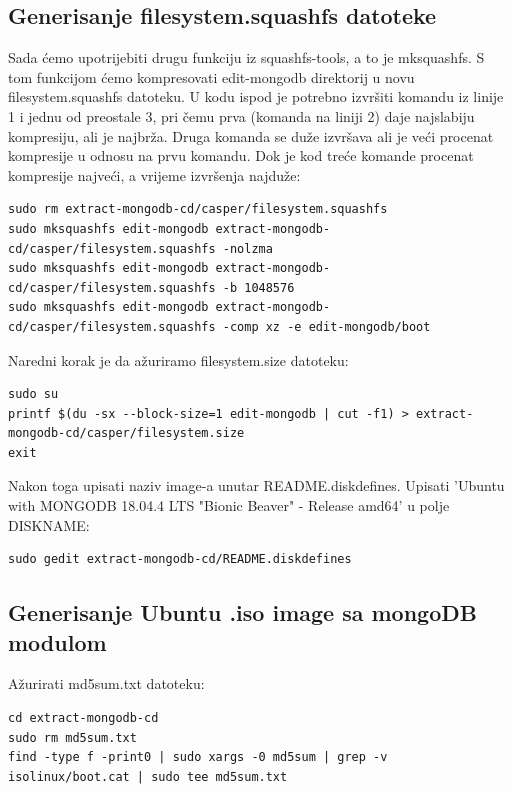\documentclass[12pt,vi]{mitthesis}
\begin{document}
\subsection*{Generisanje filesystem.squashfs datoteke}
\noindent
Sada ćemo upotrijebiti drugu funkciju iz squashfs-tools, a to je mksquashfs. S tom funkcijom ćemo kompresovati edit-mongodb direktorij u novu filesystem.squashfs datoteku. U kodu ispod je potrebno izvršiti komandu iz linije 1 i jednu od preostale 3, pri čemu prva (komanda na liniji 2) daje najslabiju kompresiju, ali je najbrža. Druga komanda se duže izvršava ali je veći procenat kompresije u odnosu na prvu komandu. Dok je kod treće komande procenat kompresije najveći, a vrijeme izvršenja najduže:
\begin{lstlisting}[style=BashInputStyle]
sudo rm extract-mongodb-cd/casper/filesystem.squashfs
sudo mksquashfs edit-mongodb extract-mongodb-cd/casper/filesystem.squashfs -nolzma 
sudo mksquashfs edit-mongodb extract-mongodb-cd/casper/filesystem.squashfs -b 1048576
sudo mksquashfs edit-mongodb extract-mongodb-cd/casper/filesystem.squashfs -comp xz -e edit-mongodb/boot
\end{lstlisting}

\noindent
Naredni korak je da ažuriramo filesystem.size datoteku:
\begin{lstlisting}[style=BashInputStyle]
sudo su
printf $(du -sx --block-size=1 edit-mongodb | cut -f1) > extract-mongodb-cd/casper/filesystem.size
exit
\end{lstlisting}

\noindent
Nakon toga upisati naziv image-a unutar README.diskdefines. 
Upisati 'Ubuntu with MONGODB 18.04.4 LTS "Bionic Beaver" - Release amd64' u polje DISKNAME:
\begin{lstlisting}[style=BashInputStyle]
sudo gedit extract-mongodb-cd/README.diskdefines
\end{lstlisting}

\subsection*{Generisanje Ubuntu .iso image sa mongoDB modulom}
\noindent
Ažurirati md5sum.txt datoteku:
\begin{lstlisting}[style=BashInputStyle]
cd extract-mongodb-cd
sudo rm md5sum.txt
find -type f -print0 | sudo xargs -0 md5sum | grep -v isolinux/boot.cat | sudo tee md5sum.txt
\end{lstlisting}
\end{document}
